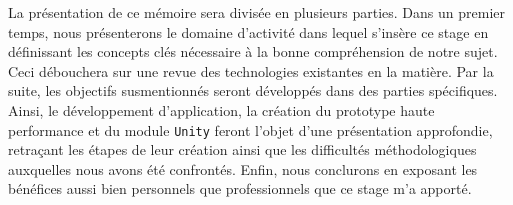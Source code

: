 La présentation de ce mémoire sera divisée en plusieurs parties. Dans un premier temps, nous présenterons le domaine d'activité dans lequel s'insère ce stage en définissant les concepts clés nécessaire à la bonne compréhension de notre sujet. Ceci débouchera sur une revue des technologies existantes en la matière. Par la suite, les objectifs susmentionnés seront développés dans des parties spécifiques. Ainsi, le développement d'application, la création du prototype haute performance et du module \texttt{Unity} feront l'objet d'une présentation approfondie, retraçant les étapes de leur création ainsi que les difficultés méthodologiques auxquelles nous avons été confrontés. Enfin, nous conclurons en exposant les bénéfices aussi bien personnels que professionnels que ce stage m'a apporté.